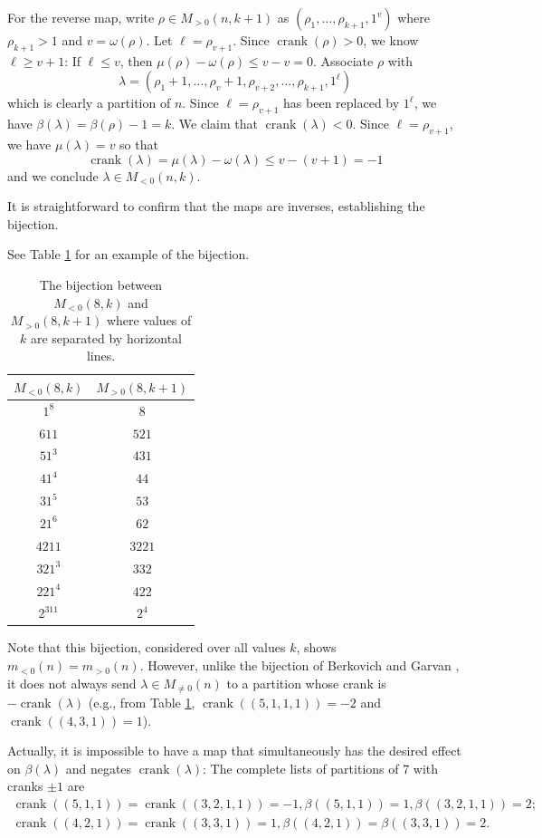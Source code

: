 \documentclass{amsart}
\theoremstyle{theorem}
\theoremstyle{definition}
\DeclareMathOperator{\ck}{crank}
\begin{document}
For the reverse map, write $\rho \in M_{>0}(n,k+1)$ as $(\rho_1, \ldots, \rho_{k+1}, 1^v)$ where $\rho_{k+1} > 1$ and $v = \omega(\rho)$.  Let $\ell = \rho_{v+1}$.  Since $\ck(\rho)>0$, we know $\ell \ge v+1$: If $\ell \le v$, then $\mu(\rho) - \omega(\rho) \le v - v = 0$. 
Associate $\rho$ with
\[ \lambda = (\rho_1 + 1, \ldots, \rho_v+1,\rho_{v+2}, \ldots, \rho_{k+1}, 1^\ell)\] 
which is clearly a partition of $n$.  Since $\ell = \rho_{v+1}$ has been replaced by $1^\ell$, we have $\beta(\lambda) = \beta(\rho) -1 = k$.  We claim that $\ck(\lambda) < 0$.  Since $\ell = \rho_{v+1}$, we have $\mu(\lambda) = v$ so that
\[\ck(\lambda) = \mu(\lambda) - \omega(\lambda) \le v - (v+1) = -1\]
and we conclude $\lambda \in M_{<0}(n,k)$.

It is straightforward to confirm that the maps are inverses, establishing the bijection.

See Table \ref{tab:cd} for an example of the bijection.

\begin{table}[t]
\renewcommand{\arraystretch}{1.1}
\caption{The bijection between $M_{<0}(8,k)$ and $M_{>0}(8,k+1)$ where values of $k$ are separated by horizontal lines.} \label{tab:cd}
\begin{tabular}{c|c}
$M_{<0}(8,k)$ & $M_{>0}(8,k+1)$ \\ \hline \hline
$1^8$ & $8$ \\ \hline
$611$ & $521$ \\
$51^3$ & $431$ \\
$41^4$ & $44$ \\
$31^5$ & $53$ \\
$21^6$ & $62$ \\ \hline
$4211$ & $3221$ \\
$321^3$ & $332$ \\
$221^4$ & $422$ \\ \hline
$2^311$ & $2^4$
\end{tabular}
\end{table}

Note that this bijection, considered over all values $k$, shows $m_{<0}(n) = m_{>0}(n)$.  However, unlike the bijection of Berkovich and Garvan \cite{bg}, it does not always send $\lambda \in M_{\ne 0}(n)$ to a partition whose crank is $-\ck(\lambda)$ (e.g., from Table \ref{tab:cd}, $\ck((5,1,1,1)) = -2$ and $\ck((4,3,1)) = 1$).

Actually, it is impossible to have a map that simultaneously has the desired effect on $\beta(\lambda)$ and negates $\ck(\lambda)$: The complete lists of partitions of 7 with cranks $\pm1$ are
\begin{gather*}
 \ck((5,1,1)) = \ck((3,2,1,1)) = -1, \beta((5,1,1)) = 1,  \beta((3,2,1,1)) = 2; \\
 \ck((4,2,1)) =  \ck((3,3,1)) = 1, \beta((4,2,1)) = \beta((3,3,1)) = 2.
 \end{gather*}
\end{document}
